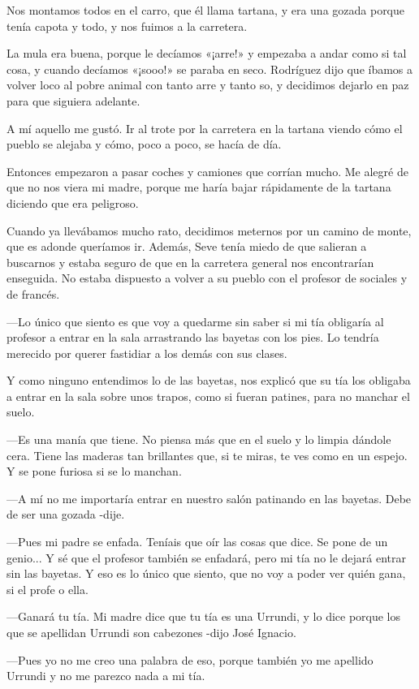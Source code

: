 \documentclass{barcodevapor3pags}
\begin{document}
Nos montamos todos en el carro, que él llama tartana, y era una gozada
porque tenía capota y todo, y nos fuimos a la carretera.~

La mula era buena, porque le decíamos «¡arre!» y empezaba a andar como
si tal cosa, y cuando decíamos «¡sooo!» se paraba en seco. Rodríguez
dijo que íbamos a volver loco al pobre animal con tanto arre y tanto so,
y decidimos dejarlo en paz para que siguiera adelante.~

A mí aquello me gustó. Ir al trote por la carretera en la tartana viendo
cómo el pueblo se alejaba y cómo, poco a poco, se hacía de día.~

Entonces empezaron a pasar coches y camiones que corrían mucho. Me
alegré de que no nos viera mi madre, porque me haría bajar rápidamente
de la tartana diciendo que era peligroso.~

Cuando ya llevábamos mucho rato, decidimos meternos por un camino de
monte, que es adonde queríamos ir. Además, Seve tenía miedo de que
salieran a buscarnos y estaba seguro de que en la carretera general nos
encontrarían enseguida. No estaba dispuesto a volver a su pueblo con el
profesor de sociales y de francés.~

---Lo único que siento es que voy a quedarme sin saber si mi tía
obligaría al profesor a entrar en la sala arrastrando las bayetas con
los pies. Lo tendría merecido por querer fastidiar a los demás con sus
clases.~

Y como ninguno entendimos lo de las bayetas, nos explicó que su tía los
obligaba a entrar en la sala sobre unos trapos, como si fueran patines,
para no manchar el suelo.~

---Es una manía que tiene. No piensa más que en el suelo y lo limpia
dándole cera. Tiene las maderas tan brillantes que, si te miras, te ves
como en un espejo. Y se pone furiosa si se lo manchan.~

---A mí no me importaría entrar en nuestro salón patinando en las
bayetas. Debe de ser una gozada -dije.~

---Pues mi padre se enfada. Teníais que oír las cosas que dice. Se pone
de un genio... Y sé que el profesor también se enfadará, pero mi tía no
le dejará entrar sin las bayetas. Y eso es lo único que siento, que no
voy a poder ver quién gana, si el profe o ella.~

---Ganará tu tía. Mi madre dice que tu tía es una Urrundi, y lo dice
porque los que se apellidan Urrundi son cabezones -dijo José Ignacio.~

---Pues yo no me creo una palabra de eso, porque también yo me apellido
Urrundi y no me parezco nada a mi tía.~
\end{document}
